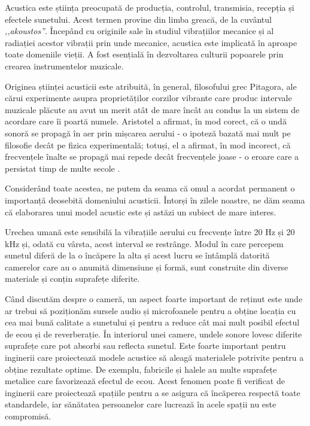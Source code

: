Acustica este știința preocupată de producția, controlul, transmisia, recepția și efectele sunetului. Acest termen provine din limba greacă, de la cuvântul \textit{,,akoustos''}. Începând cu originile sale în studiul vibrațiilor mecanice și al radiației acestor vibrații prin unde mecanice, acustica este implicată în aproape toate domeniile vieții. A fost esențială în dezvoltarea culturii popoarele prin crearea instrumentelor muzicale.

Originea științei acusticii este atribuită, în general, filosofului grec Pitagora, ale cărui experimente asupra proprietăților corzilor vibrante care produc intervale muzicale plăcute au avut un merit atât de mare încât au condus la un sistem de acordare care îi poartă numele. Aristotel a afirmat, în mod corect, că o undă sonoră se propagă în aer prin mișcarea aerului - o ipoteză bazată mai mult pe filosofie decât pe fizica experimentală; totuși, el a afirmat, în mod incorect, că frecvențele înalte se propagă mai repede decât frecvențele joase - o eroare care a persistat timp de multe secole \cite{istorie}.

Considerând toate acestea, ne putem da seama că omul a acordat permanent o importa\-nță deosebită domeniului acusticii. Întorși în zilele noastre, ne dăm seama că elaborarea unui model acustic este și astăzi un subiect de mare interes.

Urechea umană este sensibilă la vibrațiile aerului cu frecvențe între 20 Hz și 20 kHz și, odată cu vârsta, acest interval se restrânge. Modul în care percepem sunetul diferă de la o încăpere la alta și acest lucru se întâmplă datorită camerelor care au o anumită dimensiune și formă, sunt construite din diverse materiale și conțin suprafețe diferite.

Când discutăm despre o cameră, un aspect foarte important de reținut este unde ar trebui să poziționăm sursele audio și microfoanele pentru a obține locația cu cea mai bună calitate a sunetului și pentru a reduce cât mai mult posibil efectul de ecou și de reverberație. În interiorul unei camere, undele sonore lovesc diferite suprafețe care pot absorbi sau reflecta sunetul. Este foarte important pentru inginerii care proiectează modele acustice să aleagă materialele potrivite pentru a obține rezultate optime. De exemplu, fabricile și halele au multe suprafețe metalice care favorizează efectul de ecou. Acest fenomen poate fi verificat de inginerii care proiectează spațiile pentru a se asigura că încăperea respectă toate standardele, iar sănătatea persoanelor care lucrează în acele spații nu este compromisă.

